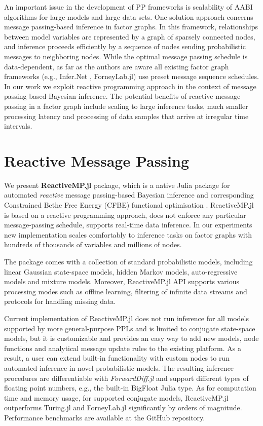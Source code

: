 \documentclass{juliacon}
\begin{document}
An important issue in the development of PP frameworks is scalability of AABI algorithms for large models and large data sets. 
One solution approach concerns message passing-based inference in factor graphs. In this framework, relationships between model variables are represented by a graph of sparsely connected nodes, 
and inference proceeds efficiently by a sequence of nodes sending probabilistic messages to neighboring nodes. While the optimal message passing schedule is data-dependent, as far as the authors are aware
all existing factor graph frameworks (e.g., Infer.Net \cite{InferNET18}, ForneyLab.jl) use preset message sequence schedules. In our work we exploit reactive programming approach in the context of message passing 
based Bayesian inference. The potential benefits of reactive message passing in a factor graph include scaling to large inference tasks, much smaller processing latency and processing of data samples that arrive at irregular time intervals.

\section{Reactive Message Passing}

We present \textbf{ReactiveMP.jl} package, which is a native Julia \cite{bezanson2017julia} package for automated \textit{reactive} message passing-based Bayesian inference and corresponding
Constrained Bethe Free Energy (CFBE) functional optimisation \cite{senoz_local_constraint_2021}. ReactiveMP.jl is based on a reactive programming approach, does not enforce any particular message-passing schedule, 
supports real-time data inference. In our experiments new implementation scales comfortably to inference tasks on factor graphs with hundreds of thousands of variables and millions of nodes.

The package comes with a collection of standard probabilistic models, including linear Gaussian state-space models, hidden Markov models, auto-regressive models and mixture models. 
Moreover, ReactiveMP.jl API supports various processing modes such as offline learning, filtering of infinite data streams and protocols for handling missing data.

Current implementation of ReactiveMP.jl does not run inference for all models supported by more general-purpose PPLs and is limited to conjugate state-space models, but it is customizable and provides an easy way to add new models, node functions and analytical message update rules to the existing platform. 
As a result, a user can extend built-in functionality with custom nodes to run automated inference in novel probabilistic models.
The resulting inference procedures are differentiable with \textit{ForwardDiff.jl} \cite{RevelsLubinPapamarkou2016} and support different types of floating point numbers, e.g., the built-in BigFloat Julia type.
As for computation time and memory usage, for supported conjugate models, ReactiveMP.jl outperforms Turing.jl and ForneyLab.jl significantly by orders of magnitude. Performance benchmarks are available at the GitHub repository.
\end{document}
